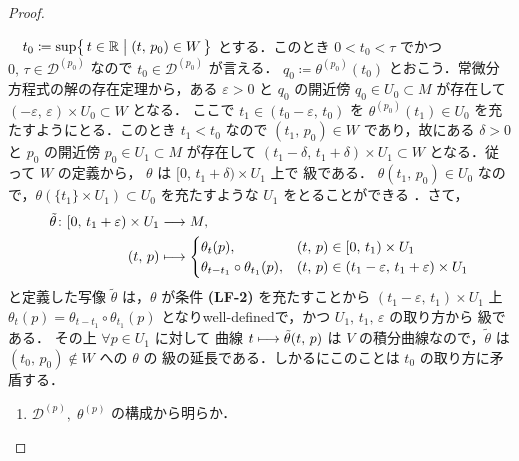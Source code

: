 \documentclass[geometry_main]{subfiles}
\begin{document}
\begin{proof}
\begin{description}
\begin{description}
            　$t_0 \coloneqq \sup \bigl\{\, t \in \mathbb{R} \bigm| (t,\, p_0) \in W \,\bigr\}$ とする．このとき $0 < t_0 < \tau$ でかつ $0,\, \tau \in \mathcal{D}^{(p_0)}$ なので $t_0 \in \mathcal{D}^{(p_0)}$ が言える．
            $q_0 \coloneqq \theta^{(p_0)}(t_0)$ とおこう．常微分方程式の解の存在定理から，ある $\varepsilon > 0$ と $q_0$ の開近傍 $q_0 \in U_0 \subset M$ が存在して $(-\varepsilon,\, \varepsilon) \times U_0 \subset W$ となる．
            ここで $t_1 \in (t_0 -\varepsilon,\, t_0)$ を $\theta^{(p_0)}(t_1) \in U_0$ を充たすようにとる．このとき $t_1 < t_0$ なので $(t_1,\, p_0) \in W$ であり，故にある $\delta > 0$ と $p_0$ の開近傍 $p_0 \in U_1 \subset M$ が存在して $(t_1 - \delta,\, t_1 + \delta) \times U_1 \subset W$ となる．従って $W$ の定義から， $\theta$ は $[0,\, t_1 + \delta) \times U_1$ 上で \cinfty 級である．
            $\theta(t_1,\, p_0) \in U_0$ なので，$\theta(\{t_1\} \times U_1) \subset U_0$ を充たすような $U_1$ をとることができる
            ．さて，
            \begin{align}
                \tilde{\theta} \colon [0,\, t_1 + \varepsilon) \times U_1 &\longrightarrow M,\\ 
                (t,\, p) &\longmapsto
                \begin{cases}
                    \theta_t(p), &(t,\, p) \in [0,\, t_1) \times U_1 \\
                    \theta_{t-t_1}\circ \theta_{t_1}(p), &(t,\, p) \in (t_1-\varepsilon,\, t_1 + \varepsilon) \times U_1
                \end{cases}
            \end{align}
            と定義した写像 $\tilde{\theta}$ は，$\theta$ が条件 \textbf{\textsf{(LF-2)}} を充たすことから $(t_1 - \varepsilon,\, t_1) \times U_1$ 上 $\theta_t (p) = \theta_{t-t_1}\circ \theta_{t_1}(p)$ となりwell-definedで，かつ $U_1,\, t_1,\, \varepsilon$ の取り方から \cinfty 級である．
            その上 $\forall p \in U_1$ に対して \cinfty 曲線 $t \longmapsto \tilde{\theta}(t,\, p)$ は $V$ の積分曲線なので，$\tilde{\theta}$ は $(t_0,\, p_0) \notin W$ への $\theta$ の \cinfty 級の延長である．しかるにこのことは $t_0$ の取り方に矛盾する．
        \end{description}
    \end{description}
    \begin{enumerate}
        \item $\mathcal{D}^{(p)},\; \theta^{(p)}$ の構成から明らか．

\end{enumerate}
\end{proof}
\end{document}
